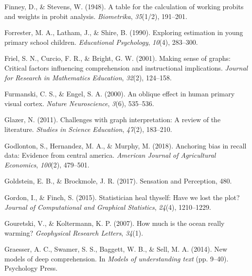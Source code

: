 \documentclass[print]{nuthesis}
\newlength{\cslhangindent}
\newenvironment{CSLReferences}%
{\setlength{\parindent}{0pt}%
\everypar{\setlength{\hangindent}{\cslhangindent}}\ignorespaces}%
{\par}
\begin{document}
\begin{CSLReferences}{1}{0}
\leavevmode{}%
Finney, D., \& Stevens, W. (1948). A table for the calculation of working probits and weights in probit analysis. \emph{Biometrika}, \emph{35}(1/2), 191--201.

\leavevmode{}%
Forrester, M. A., Latham, J., \& Shire, B. (1990). Exploring estimation in young primary school children. \emph{Educational Psychology}, \emph{10}(4), 283--300.

\leavevmode{}%
Friel, S. N., Curcio, F. R., \& Bright, G. W. (2001). Making sense of graphs: Critical factors influencing comprehension and instructional implications. \emph{Journal for Research in Mathematics Education}, \emph{32}(2), 124--158.

\leavevmode{}%
Furmanski, C. S., \& Engel, S. A. (2000). An oblique effect in human primary visual cortex. \emph{Nature Neuroscience}, \emph{3}(6), 535--536.

\leavevmode{}%
Glazer, N. (2011). Challenges with graph interpretation: A review of the literature. \emph{Studies in Science Education}, \emph{47}(2), 183--210.

\leavevmode{}%
Godlonton, S., Hernandez, M. A., \& Murphy, M. (2018). Anchoring bias in recall data: Evidence from central america. \emph{American Journal of Agricultural Economics}, \emph{100}(2), 479--501.

\leavevmode{}%
Goldstein, E. B., \& Brockmole, J. R. (2017). Sensation and {Perception}, 480.

\leavevmode{}%
Gordon, I., \& Finch, S. (2015). Statistician heal thyself: Have we lost the plot? \emph{Journal of Computational and Graphical Statistics}, \emph{24}(4), 1210--1229.

\leavevmode{}%
Gouretski, V., \& Koltermann, K. P. (2007). How much is the ocean really warming? \emph{Geophysical Research Letters}, \emph{34}(1).

\leavevmode{}%
Graesser, A. C., Swamer, S. S., Baggett, W. B., \& Sell, M. A. (2014). New models of deep comprehension. In \emph{Models of understanding text} (pp. 9--40). Psychology Press.


\end{CSLReferences}
\end{document}
